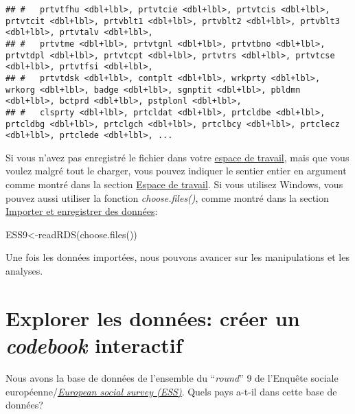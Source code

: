 \documentclass[
]{book}
\newenvironment{Shaded}{\begin{snugshade}}{\end{snugshade}}
\newcommand{\FunctionTok}[1]{\textcolor[rgb]{0.00,0.00,0.00}{#1}}
\newcommand{\NormalTok}[1]{#1}
\newcommand{\OtherTok}[1]{\textcolor[rgb]{0.56,0.35,0.01}{#1}}
\begin{document}
\begin{verbatim}
## #   prtvtfhu <dbl+lbl>, prtvtcie <dbl+lbl>, prtvtcis <dbl+lbl>, prtvtcit <dbl+lbl>, prtvblt1 <dbl+lbl>, prtvblt2 <dbl+lbl>, prtvblt3 <dbl+lbl>, prtvtalv <dbl+lbl>,
## #   prtvtme <dbl+lbl>, prtvtgnl <dbl+lbl>, prtvtbno <dbl+lbl>, prtvtdpl <dbl+lbl>, prtvtcpt <dbl+lbl>, prtvtrs <dbl+lbl>, prtvtcse <dbl+lbl>, prtvtfsi <dbl+lbl>,
## #   prtvtdsk <dbl+lbl>, contplt <dbl+lbl>, wrkprty <dbl+lbl>, wrkorg <dbl+lbl>, badge <dbl+lbl>, sgnptit <dbl+lbl>, pbldmn <dbl+lbl>, bctprd <dbl+lbl>, pstplonl <dbl+lbl>,
## #   clsprty <dbl+lbl>, prtcldat <dbl+lbl>, prtcldbe <dbl+lbl>, prtcldbg <dbl+lbl>, prtclgch <dbl+lbl>, prtclbcy <dbl+lbl>, prtclecz <dbl+lbl>, prtclede <dbl+lbl>, ...
\end{verbatim}

Si vous n'avez pas enregistré le fichier dans votre \protect\hyperlink{working_directory}{espace de travail}, mais que vous voulez malgré tout le charger, vous pouvez indiquer le sentier entier en argument comme montré dans la section \protect\hyperlink{working_directory}{Espace de travail}. Si vous utilisez Windows, vous pouvez aussi utiliser la fonction \emph{choose.files()}, comme montré dans la section \protect\hyperlink{import_donnees}{Importer et enregistrer des données}:

\begin{Shaded}
\begin{Highlighting}[]
\NormalTok{ESS9}\OtherTok{\textless{}{-}}\FunctionTok{readRDS}\NormalTok{(}\FunctionTok{choose.files}\NormalTok{())}
\end{Highlighting}
\end{Shaded}

Une fois les données importées, nous pouvons avancer sur les manipulations et les analyses.

\hypertarget{explorer-les-donnuxe9es-cruxe9er-un-codebook-interactif}{%
\section{\texorpdfstring{Explorer les données: créer un \emph{codebook} interactif}{Explorer les données: créer un codebook interactif}}\label{explorer-les-donnuxe9es-cruxe9er-un-codebook-interactif}}

Nous avons la base de données de l'ensemble du ``\emph{round}'' 9 de l'Enquête sociale européenne/\href{https://www.europeansocialsurvey.org/}{\emph{European social survey (ESS)}}. Quels pays a-t-il dans cette base de données?
\end{document}

